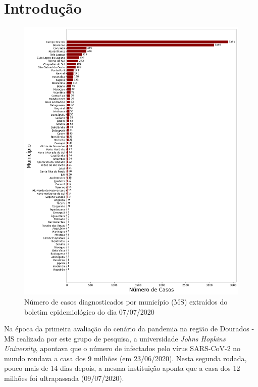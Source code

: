 \documentclass[12pt]{article}
\begin{document}
\section{Introdução}

\begin{figure}[!htb]
  \centering
  \includegraphics[width=1\textwidth]{figs/casos_por_municipio.png}
  \caption{Número de casos diagnosticados por município (MS) extraídos do boletim epidemiológico do dia 07/07/2020}
  \label{fig:casosMuni}
  \end{figure}

Na época da primeira avaliação do cenário da pandemia na região de Dourados -MS realizada por este grupo de pesquisa, a universidade \textit{Johns Hopkins University}, apontava que o número de infectados pelo vírus SARS-CoV-2 no mundo rondava a casa dos 9 milhões (em 23/06/2020). Nesta segunda rodada, pouco mais de 14 dias depois, a mesma instituição aponta que a casa dos 12 milhões foi ultrapassada (09/07/2020).
\end{document}

